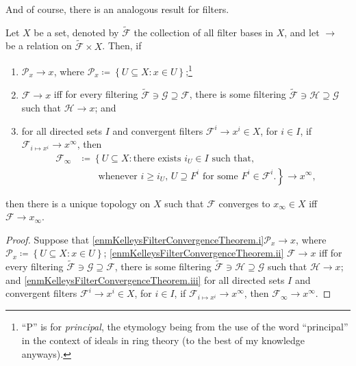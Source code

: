 And of course, there is an analogous result for filters.
\begin{thm}\label{KelleysFilterConvergenceTheorem}
Let $X$ be a set, denoted by $\tilde{\mathcal{F}}$ the collection of all filter bases in $X$, and let $\to$ be a relation on $\tilde{\mathcal{F}}\times X$.  Then, if
\begin{enumerate}
\item \label{enmKelleysFilterConvergenceTheorem.i}$\mathcal{P}_x\to x$, where $\mathcal{P}_x\coloneqq \left\{ U\subseteq X:x\in U\right\}$;\footnote{``P'' is for \emph{principal}, the etymology being from the use of the word ``principal'' in the context of ideals in ring theory (to the best of my knowledge anyways).}
\item \label{enmKelleysFilterConvergenceTheorem.ii}$\mathcal{F}\to x$ iff for every filtering $\tilde{\mathcal{F}}\ni \mathcal{G}\supseteq \mathcal{F}$, there is some filtering $\tilde{\mathcal{F}}\ni \mathcal{H}\supseteq \mathcal{G}$ such that $\mathcal{H}\to x$; and
\item \label{enmKelleysFilterConvergenceTheorem.iii}for all directed sets $I$ and convergent filters $\mathcal{F}^i\to x^i\in X$, for $i\in I$, if $\mathcal{F}_{i\mapsto x^i}\to x^\infty$, then
\begin{equation}
\begin{split}
\mathcal{F}_\infty & \coloneqq \left\{ U\subseteq X:\text{there exists }i_U\in I\text{ such that,}\right. \\
& \qquad \left. \text{whenever }i\geq i_U\text{, }U\supseteq F^i\text{ for some }F^i\in \mathcal{F}^i\text{.}\right\} \to x^\infty ,
\end{split}
\end{equation}
\end{enumerate}
then there is a unique topology on $X$ such that $\mathcal{F}$ converges to $x_\infty \in X$ iff $\mathcal{F}\to x_\infty$.
\begin{proof}
Suppose that \ref{enmKelleysFilterConvergenceTheorem.i}$\mathcal{P}_x\to x$, where $\mathcal{P}_x\coloneqq \left\{ U\subseteq X:x\in U\right\}$; \ref{enmKelleysFilterConvergenceTheorem.ii} $\mathcal{F}\to x$ iff for every filtering $\tilde{\mathcal{F}}\ni \mathcal{G}\supseteq \mathcal{F}$, there is some filtering $\tilde{\mathcal{F}}\ni \mathcal{H}\supseteq \mathcal{G}$ such that $\mathcal{H}\to x$; and \ref{enmKelleysFilterConvergenceTheorem.iii} for all directed sets $I$ and convergent filters $\mathcal{F}^i\to x^i\in X$, for $i\in I$, if $\mathcal{F}_{i\mapsto x^i}\to x^\infty$, then $\mathcal{F}_\infty \to x^\infty$.


\end{proof}
\end{thm}
